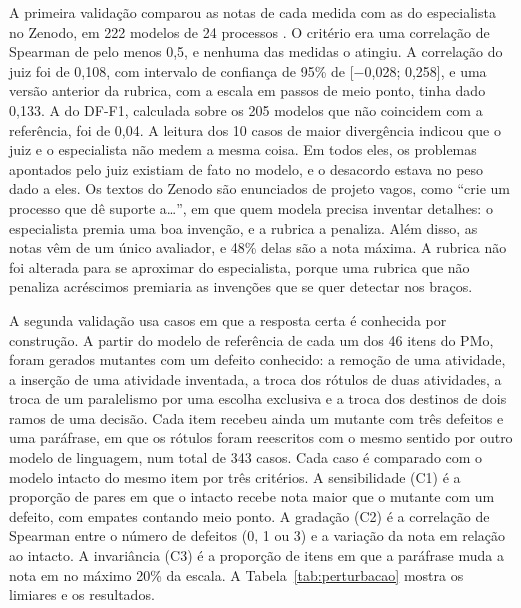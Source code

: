 A primeira validação comparou as notas de cada medida com as do especialista no Zenodo, em 222 modelos de 24 processos \cite{mangler2023textual}. O critério era uma correlação de Spearman de pelo menos 0,5, e nenhuma das medidas o atingiu. A correlação do juiz foi de 0,108, com intervalo de confiança de 95\% de [$-$0,028; 0,258], e uma versão anterior da rubrica, com a escala em passos de meio ponto, tinha dado 0,133. A do DF-F1, calculada sobre os 205 modelos que não coincidem com a referência, foi de 0,04. A leitura dos 10 casos de maior divergência indicou que o juiz e o especialista não medem a mesma coisa. Em todos eles, os problemas apontados pelo juiz existiam de fato no modelo, e o desacordo estava no peso dado a eles. Os textos do Zenodo são enunciados de projeto vagos, como ``crie um processo que dê suporte a\ldots'', em que quem modela precisa inventar detalhes: o especialista premia uma boa invenção, e a rubrica a penaliza. Além disso, as notas vêm de um único avaliador, e 48\% delas são a nota máxima. A rubrica não foi alterada para se aproximar do especialista, porque uma rubrica que não penaliza acréscimos premiaria as invenções que se quer detectar nos braços.

A segunda validação usa casos em que a resposta certa é conhecida por construção. A partir do modelo de referência de cada um dos 46 itens do PMo, foram gerados mutantes com um defeito conhecido: a remoção de uma atividade, a inserção de uma atividade inventada, a troca dos rótulos de duas atividades, a troca de um paralelismo por uma escolha exclusiva e a troca dos destinos de dois ramos de uma decisão. Cada item recebeu ainda um mutante com três defeitos e uma paráfrase, em que os rótulos foram reescritos com o mesmo sentido por outro modelo de linguagem, num total de 343 casos. Cada caso é comparado com o modelo intacto do mesmo item por três critérios. A sensibilidade (C1) é a proporção de pares em que o intacto recebe nota maior que o mutante com um defeito, com empates contando meio ponto. A gradação (C2) é a correlação de Spearman entre o número de defeitos (0, 1 ou 3) e a variação da nota em relação ao intacto. A invariância (C3) é a proporção de itens em que a paráfrase muda a nota em no máximo 20\% da escala. A Tabela~\ref{tab:perturbacao} mostra os limiares e os resultados.

\begin{table}[htb]
\end{table}

